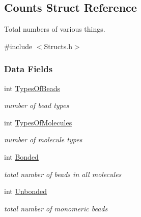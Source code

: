 \hypertarget{structCounts}{}\subsection{Counts Struct Reference}
\label{structCounts}


Total numbers of various things.  




{\ttfamily \#include $<$Structs.\+h$>$}

\subsubsection*{Data Fields}
\begin{DoxyCompactItemize}
\item 
\mbox{\label{structCounts_af3279f5fb3d9aee54a1e354a60c448ef}} 
int \hyperlink{structCounts_af3279f5fb3d9aee54a1e354a60c448ef}{Types\+Of\+Beads}
\begin{DoxyCompactList}\small\item\em number of bead types \end{DoxyCompactList}\item 
\mbox{\label{structCounts_a91e98f2cc3bc05dda7cc7a418a3ae0c8}} 
int \hyperlink{structCounts_a91e98f2cc3bc05dda7cc7a418a3ae0c8}{Types\+Of\+Molecules}
\begin{DoxyCompactList}\small\item\em number of molecule types \end{DoxyCompactList}\item 
\mbox{\label{structCounts_aa7f32e92529d3b29646a7d460a61871c}} 
int \hyperlink{structCounts_aa7f32e92529d3b29646a7d460a61871c}{Bonded}
\begin{DoxyCompactList}\small\item\em total number of beads in all molecules \end{DoxyCompactList}\item 
\mbox{\label{structCounts_ae734b9c6f2dde968b299a9f1bc2b003e}} 
int \hyperlink{structCounts_ae734b9c6f2dde968b299a9f1bc2b003e}{Unbonded}
\begin{DoxyCompactList}\small\item\em total number of monomeric beads \end{DoxyCompactList}\item 

\end{DoxyCompactItemize}
